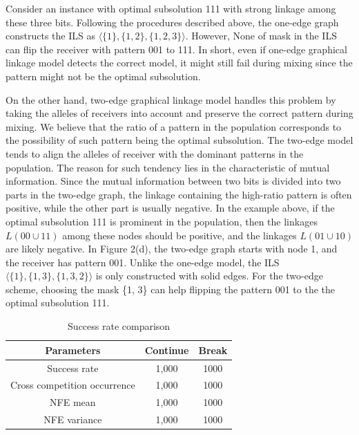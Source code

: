 \documentclass{sig-alternate-05-2015}
\begin{document}
Consider an instance with  optimal subsolution 111 with  strong  linkage among these three bits. Following the procedures described above, the one-edge graph constructs the ILS as $\langle\{1\}, \{1, 2\}, \{1, 2, 3\}\rangle$. However, None of mask in the ILS can flip the receiver with pattern 001 to 111. In short, even if one-edge graphical linkage model detects the correct model, it might still fail during mixing since the pattern might not be the optimal subsolution.


On the other hand, two-edge graphical linkage model  handles this problem by taking the alleles of receivers into account and preserve the correct pattern during mixing. We believe that the ratio of a pattern in the population corresponds to the possibility of such pattern being the optimal subsolution. The two-edge model tends to align the alleles of receiver  with the dominant patterns in the population. The reason for such tendency lies in the characteristic of mutual information. Since the mutual information between two bits is divided into two parts in the two-edge graph,  the  linkage containing the high-ratio pattern  is often positive, while the other part is usually negative.  In the example above, if the optimal subsolution 111 is prominent in the population, then the linkages $L(00\cup11)$ among these nodes should be positive, and the linkages $L(01\cup10)$ are likely negative.  In Figure 2(d), the two-edge graph starts with node 1, and the receiver has pattern  001. Unlike the one-edge model, the ILS  $\langle\{1\}, \{1, 3\}, \{1, 3, 2\}\rangle$ is only constructed with solid edges. For the two-edge scheme, choosing the mask \{1, 3\} can help flipping the pattern 001 to the the optimal subsolution 111.    


\begin{table}[ht]
\centering
\begin{tabular}{ |c|c|c| } \hline
Parameters & Continue & Break \\ \hline
Success rate 					& 1,000& 1000\\ \hline
Cross competition occurrence	& 1,000& 1000\\ \hline
NFE mean				 		& 1,000& 1000\\ \hline
NFE variance					& 1,000& 1000\\ \hline
\end{tabular}
\caption{Success rate comparison}
\end{table}
\end{document}
